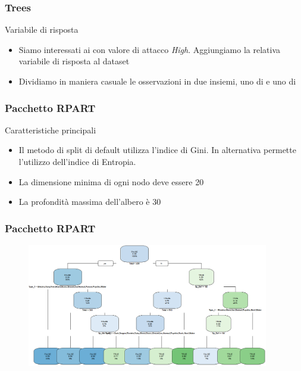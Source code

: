 	\begin{frame}
		\frametitle{Trees}	
		\begin{block}{Variabile di risposta}
			\begin{itemize}
				\item Siamo interessati ai \pok con valore di attacco \emph{High}. Aggiungiamo la relativa variabile di risposta al dataset
				\item Dividiamo in maniera casuale le osservazioni in due insiemi, uno di  e uno di 
			\end{itemize}
		\end{block}
		\begin{center}
			\begin{figure}
				
			\end{figure}
		\end{center}
	\end{frame}

	\begin{frame}
		\frametitle{Pacchetto RPART}
		\begin{block}{Caratteristiche principali}
			\begin{itemize}
				\item Il metodo di split di default utilizza l'indice di Gini. In alternativa permette l'utilizzo dell'indice di Entropia.
				\item La dimensione minima di ogni nodo deve essere 20
				\item La profondità massima dell'albero è 30
			\end{itemize}
		\end{block}
	\end{frame}


	\begin{frame}
		\frametitle{Pacchetto RPART}
		\begin{center}
			\begin{figure}
				
			\end{figure}
			\begin{figure}
				\includegraphics[width=0.94\textwidth]{img/rpartGini}
			\end{figure}
		\end{center}
	\end{frame}

